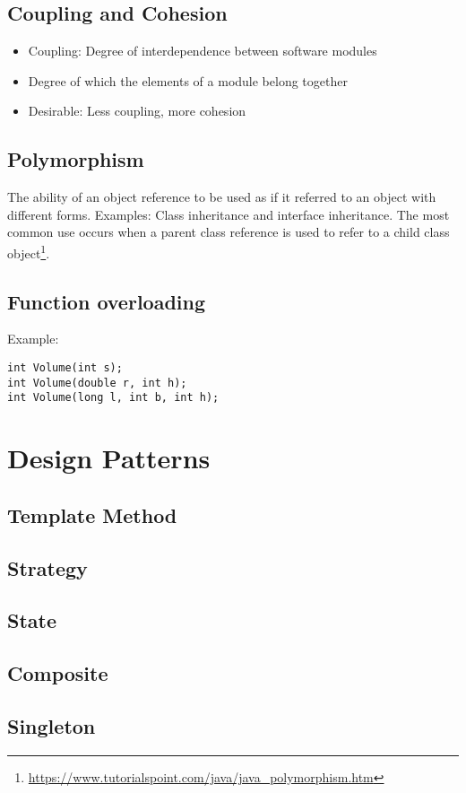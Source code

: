 \documentclass[a4paper, 11.25pt]{article}
\begin{document}
\subsection{Coupling and Cohesion}
\begin{itemize}
    \item Coupling: Degree of interdependence between software modules
    \item Degree of which the elements of a module belong together
    \item Desirable: Less coupling, more cohesion
\end{itemize}

\subsection{Polymorphism}
The ability of an object reference to be used as if it referred to an object with different forms. Examples: Class inheritance and interface inheritance. The most common use occurs when a parent class reference is used to refer to a child class object\footnote{\url{https://www.tutorialspoint.com/java/java_polymorphism.htm}}.

\subsection{Function overloading}
Example:
\begin{lstlisting}[style=CStyle]
int Volume(int s);
int Volume(double r, int h);
int Volume(long l, int b, int h);\end{lstlisting}

\clearpage
\section{Design Patterns}
\subsection{Template Method}
\subsection{Strategy}
\subsection{State}
\subsection{Composite}
\subsection{Singleton}
\end{document}
